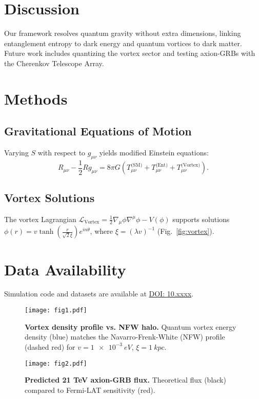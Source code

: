 \documentclass{nature}
\begin{document}
\section*{Discussion}
Our framework resolves quantum gravity without extra dimensions, linking entanglement entropy to dark energy and quantum vortices to dark matter. Future work includes quantizing the vortex sector and testing axion-GRBs with the Cherenkov Telescope Array.

\section*{Methods}
\subsection*{Gravitational Equations of Motion}
Varying $S$ with respect to $g_{\mu\nu}$ yields modified Einstein equations:
\begin{equation}
R_{\mu\nu} - \frac{1}{2} R g_{\mu\nu} = 8\pi G \left( T_{\mu\nu}^{\text{(SM)}} + T_{\mu\nu}^{\text{(Ent)}} + T_{\mu\nu}^{\text{(Vortex)}} \right).
\end{equation}

\subsection*{Vortex Solutions}
The vortex Lagrangian $\mathcal{L}_{\text{Vortex}} = \frac{1}{2} \nabla_\mu \phi \nabla^\mu \phi - V(\phi)$ supports solutions $\phi(r) = v \tanh\left(\frac{r}{\sqrt{2}\xi}\right) e^{i n\theta}$, where $\xi = (\lambda v)^{-1}$ (Fig.~\ref{fig:vortex}).

\section*{Data Availability}
Simulation code and datasets are available at \href{https://doi.org/10.xxxx}{DOI: 10.xxxx}.

\begin{figure}[t]
\centering
\texttt{[image: fig1.pdf]}
\caption{\textbf{Vortex density profile vs. NFW halo.} Quantum vortex energy density (blue) matches the Navarro-Frenk-White (NFW) profile (dashed red) for $v = \SI{1e-3}{eV}$, $\xi = \SI{1}{kpc}$.}
\label{fig:rotation}
\end{figure}

\begin{figure}[t]
\centering
\texttt{[image: fig2.pdf]}
\caption{\textbf{Predicted 21 TeV axion-GRB flux.} Theoretical flux (black) compared to Fermi-LAT sensitivity (red).}
\label{fig:grb}
\end{figure}
\end{document}
